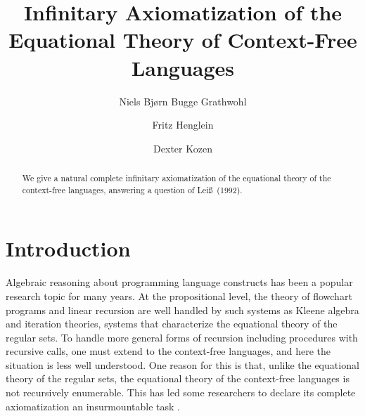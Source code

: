 \documentclass[copyright,creativecommons]{eptcs}
\theoremstyle{remark}
\newcommand{\fhcomment}[1]{\textcolor{red}{[\textbf{Comment (FH)}: {#1}]}}
\newcommand{\dkcomment}[1]{\textcolor{blue}{[\textbf{Comment (DK)}: {#1}]}}
\renewcommand{\fhcomment}[1]{}
\renewcommand{\dkcomment}[1]{}
\begin{document}
\title{Infinitary Axiomatization of the Equational Theory of Context-Free Languages}
\author{Niels Bj\o rn Bugge Grathwohl
\and
Fritz Henglein
\and
Dexter Kozen
}
\def\titlerunning{Infinitary Axiomatization of the Equational Theory of Context-Free Languages}
\def\authorrunning{N.B.B.~Grathwohl, F.~Henglein, D.~Kozen}

\maketitle

\begin{abstract}
We give a natural complete infinitary axiomatization of the equational theory of the context-free languages, answering a question of Lei\ss\ (1992).
\end{abstract}

\section{Introduction}
\label{sec:intro}

Algebraic reasoning about programming language constructs has been a popular research topic for many years. At the propositional level, the theory of flowchart programs and linear recursion are well handled by such systems as 
\fhcomment{Write: affine instead of linear}\dkcomment{I believe linear recursion is standard terminology.\\
http://www.csse.monash.edu.au/~lloyd/tildeAlgDS/Recn/Linear/ \\
http://mitpress.mit.edu/sicp/chapter1/node12.html \\
http://www.sparknotes.com/cs/recursion/whatisrecursion/section2.rhtml}\fhcomment{You win.  How did we ever end up calling something like , with , a linear function...}Kleene algebra and iteration theories, systems that characterize the equational theory of the regular sets. To handle more general forms of recursion including procedures with recursive calls, one must extend to the context-free languages, and here the situation is less well understood. One reason for this is that, unlike the equational theory of the regular sets, the equational theory of the context-free languages is not recursively enumerable. This has led some researchers to declare its complete axiomatization an insurmountable task \cite{leiss92b}.
\end{document}
